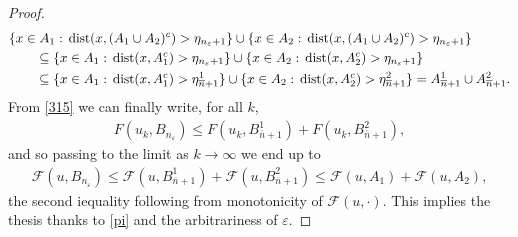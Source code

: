 \documentclass[a4paper,11pt]{article}
\numberwithin{equation}{section}
\def\dist{\,{\rm dist}}
\begin{document}
\begin{proof}
\begin{align*}
&\{x\in A_1:\dist(x,(A_1\cup A_2)^c)>\eta_{n_\varepsilon+1}\}\cup  \{x\in A_2:\dist(x,(A_1\cup A_2)^c)>\eta_{n_\varepsilon+1}\}\\
&\qquad \subseteq \{x\in A_1:\dist(x,A_1^c)>\eta_{n_\varepsilon+1}\}\cup  \{x\in A_2:\dist(x,A_2^c)>\eta_{n_\varepsilon+1}\}\\
&\qquad \subseteq \{x\in A_1:\dist(x,A_1^c)>\eta^1_{\overline n+1}\}\cup  \{x\in A_2:\dist(x,A_2^c)>\eta^2_{\overline n+1}\}= A^1_{\overline n+1}\cup A^2_{\overline n+1}.
\end{align*}
From \eqref{315} we can finally write, for all $k$,
\begin{align*}
F(u_k,B_{n_\varepsilon})\leq F(u_k,B^1_{\overline n+1})+F(u_k,B^2_{\overline n+1}),
\end{align*}
and so passing to the limit as $k\rightarrow \infty$ we end up to
\begin{align}
\mathcal F(u,B_{n_\varepsilon})\leq \mathcal F(u,B^1_{\overline n+1})+\mathcal F(u,B^2_{\overline n+1})\leq \mathcal F(u,A_1)+\mathcal F(u,A_2),
\end{align}
the second iequality following from monotonicity of $\mathcal F(u,\cdot)$.
This implies the thesis thanks to 
\eqref{pi} and the arbitrariness of $\varepsilon$.
\end{proof}
\end{document}
